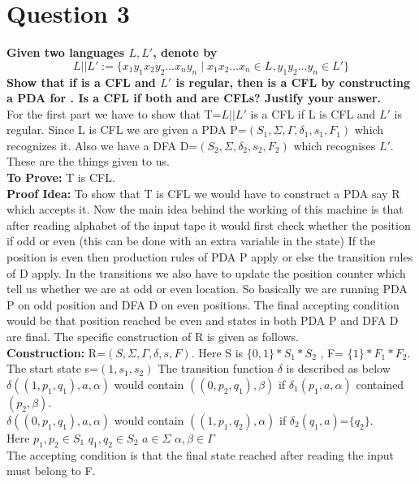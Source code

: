 \documentclass{article}
\begin{document}
\section{Question 3}
\textbf{Given two languages $L, L'$, denote by $$L||L' := \{x_1y_1x_2y_2 \dots x_ny_n \mid x_1x_2 \dots x_n \in L, y_1y_2\dots y_n \in L'\}$$ Show that if  is a CFL and $L'$ is regular, then  is a CFL by constructing a PDA for . Is  a CFL if both  and  are CFLs? Justify your answer.}\\
\newline 
For the first part we have to show that T=$L||L'$ is a CFL if L is CFL and $L'$ is regular. Since L is CFL we are given a PDA P=$(S_1,\Sigma,\Gamma,\delta_1,s_1,F_1)$ which recognizes it. Also we have a DFA D=$(S_2,\Sigma,\delta_2,s_2,F_2)$ which recognises $L'$. These are the things given to us.\\
\textbf{To Prove:} T is CFL.\\
\textbf{Proof Idea:} To show that T is CFL we would have to construct a PDA say R which accepts it. Now the main idea behind the working of this machine is that after reading alphabet of the input tape it would first check whether the position if odd or even (this can be done with an extra variable in the state) If the position is even then production rules of PDA P apply or else the transition rules of D apply. In the transitions we also have to update the position counter which tell us whether we are at odd or even location. So basically we are running PDA P on odd position and DFA D on even positions. The final accepting condition would be that position reached be even and states in both PDA P and DFA D are final. The specific construction of R is given as follows.\\
\textbf{Construction:} R=$(S,\Sigma,\Gamma,\delta,s,F)$. Here S is  $\{0,1\}*S_1 * S_2$ , F= $\{1\}*F_1 * F_2$. The start state s=$(1,s_1,s_2)$ The transition function $\delta$ is described as below\\
$\delta((1,p_1 ,q_1),a,\alpha)$ would contain $((0,p_2,q_1),\beta)$ if $\delta_1(p_1,a,\alpha)$ contained $(p_2,\beta)$.\\
$\delta((0,p_1 ,q_1),a,\alpha)$ would contain $((1,p_1,q_2),\alpha)$ if $\delta_2(q_1,a)$=$\{q_2\}$.\\
Here $p_1,p_2 \in S_1$  $q_1,q_2 \in S_2$  $a \in \Sigma$  $\alpha , \beta \in \Gamma$\\
The accepting condition is that the final state reached after reading the input must belong to F.\\
\end{document}
